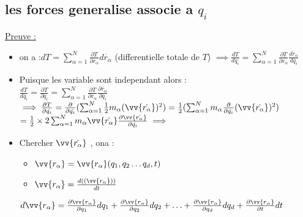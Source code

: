 \documentclass[12pt]{book}
\begin{document}
             \subsection{les forces generalise associe a $q_i$}
             \begin{center}
             \end{center}
             \underline{Preuve :} \\ 
             \begin{itemize}
                \item on a :$dT = \sum^N_{\alpha =1} \frac{\partial T}{\partial \dot{r_\alpha}}d\dot{r_\alpha}$ (differentielle totale de $T$) 
                $\implies \frac{dT}{d\dot{q_i}} = \sum^N_{\alpha =1} \frac{\partial T}{\partial \dot{r_\alpha}}\frac{d\dot{r_\alpha}}{d\dot{q_i}}$ \\
                \item Puisque les variable sont independant alors :\\
                $ \frac{dT}{d\dot{q_i}}=\frac{\partial T}{\partial\dot{q_i}} = \sum^N_{\alpha =1} \frac{\partial T}{\partial \dot{r_\alpha}}\frac{\partial\dot{r_\alpha}}{\partial\dot{q_i}}$ 
                $\implies \frac{\partial T}{\partial \dot{q_i}}=\frac{\partial}{\partial \dot{q_i}}(\sum^N_{\alpha =1} \frac{1}{2}m_\alpha(\vv{\dot{r_\alpha}})^2)= \frac{1}{2}(\sum^N_{\alpha =1} m_\alpha \frac{\partial}{\partial\dot{q_i}}(\vv{\dot{r_\alpha}})^2)$
                \\ $= \frac{1}{2}\times 2 \sum^N_{\alpha =1} m_\alpha \vv{\dot{r_\alpha}}\frac{\partial \vv{\dot{r_\alpha}}}{\partial\dot{q_i}} \implies$ \\
                \pagebreak
                \item Chercher $\vv{\dot{r_\alpha}}$ , ona :
                \begin{itemize}
                    \item $\vv{r_\alpha} = \vv{r_\alpha} (q_1,q_2\ldots q_d , t) $
                    \item $\vv{r_\alpha} = \frac{d((\vv{r_\alpha}))}{dt}$
                \end{itemize}
                $d\vv{r_\alpha} = \frac{\partial\vv{r_\alpha}}{\partial q_1}dq_1+\frac{\partial\vv{r_\alpha}}{\partial q_2}dq_2 + \ldots +\frac{\partial\vv{r_\alpha}}{\partial q_d}dq_d+\frac{\partial\vv{r_\alpha}}{\partial t}dt$ \\

\end{itemize}
\end{document}
